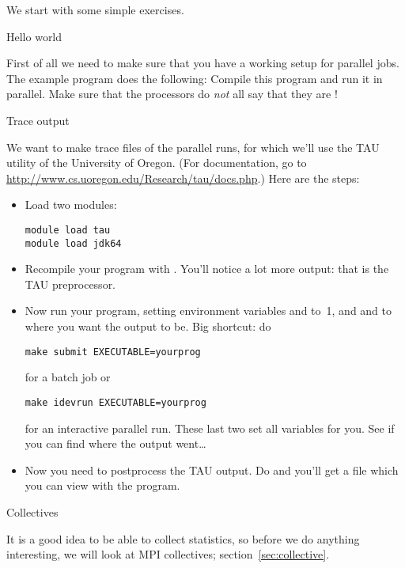 We start with some simple exercises.

 {Hello world}

First of all we need to make sure that you have a working setup for
parallel jobs. The example program  does the
following:
Compile this program and run it in parallel. Make sure that the processors
do \emph{not} all say that they are !

\begin{istc}
   {Trace output}

  We want to make trace files of the parallel runs, for which we'll
  use the TAU utility of the University of Oregon. 
  (For documentation, go to \url{http://www.cs.uoregon.edu/Research/tau/docs.php}.)
  Here are the steps:
  \begin{itemize}
  \item Load two modules:
\begin{verbatim}
module load tau
module load jdk64
\end{verbatim}
  \item Recompile your program with . You'll notice a
    lot more output: that is the TAU preprocessor.
  \item Now run your program, setting environment variables
     and  to~1, and  and
     to where you want the output to be.  Big shortcut:
    do 
\begin{verbatim}
make submit EXECUTABLE=yourprog
\end{verbatim}
    for a batch job or 
\begin{verbatim}
make idevrun EXECUTABLE=yourprog
\end{verbatim}
    for an interactive parallel
    run. These last two set all variables for you. See if you can find
    where the output went\ldots
  \item Now you need to postprocess the TAU output. Do  and you'll get a file
     which you can view with the 
    program.
  \end{itemize}
\end{istc}

 {Collectives}

It is a good idea to be able to collect statistics, so before we do
anything interesting, we will look at MPI collectives;
section~\ref{sec:collective}.

